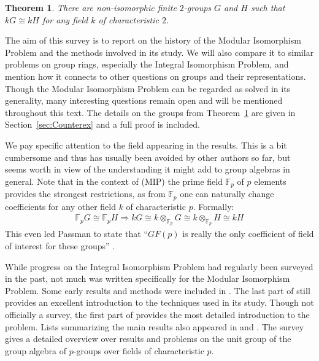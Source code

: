 \documentclass[11pt, a4paper]{amsart}
\newtheorem{theorem}{Theorem}[section]
\theoremstyle{definition}
\begin{document}
\begin{theorem}\label{th:counterex}\cite{GarciaLucasMargolisDelRioCounterexample} 
There are non-isomorphic finite $2$-groups $G$ and $H$ such that $kG \cong kH$ for any field $k$ of characteristic $2$.
\end{theorem}

The aim of this survey is to report on the history of the Modular Isomorphism Problem and the methods involved in its study. We will also compare it to similar problems on group rings, especially the Integral Isomorphism Problem, and mention how it connects to other questions on groups and their representations. Though the Modular Isomorphism Problem can be regarded as solved in its generality, many interesting questions remain open and will be mentioned throughout this text. The details on the groups from Theorem~\ref{th:counterex} are given in Section~\ref{sec:Counterex} and a full proof is included.

We pay specific attention to the field appearing in the results. This is a bit cumbersome and thus has usually been avoided by other authors so far, but seems worth in view of the understanding it might add to group algebras in general. Note that in the context of (MIP) the prime field $\mathbb{F}_p$ of $p$ elements provides the strongest restrictions, as from $\mathbb{F}_p$ one can naturally change coefficients for any other field $k$ of characteristic $p$. Formally: 
\begin{align}\label{eq:TensorFp}
\mathbb{F}_pG \cong \mathbb{F}_pH \Rightarrow kG \cong k \otimes_{\mathbb{F}_p}G \cong k \otimes_{\mathbb{F}_p}H \cong kH 
\end{align}
 This even led Passman to state that ``$GF(p)$ is really the only coefficient of field of interest for these groups'' \cite[p. 669]{PassmanAlgebraicStructure}. 

While progress on the Integral Isomorphism Problem had regularly been surveyed in the past, not much was written specifically for the Modular Isomorphism Problem. Some early results and methods were included in \cite{PassmanAlgebraicStructure, Sehgal78}. The last part of \cite{SandlingSurvey} still provides an excellent introduction to the techniques used in its study. Though not officially a survey, the first part of \cite{HertweckSoriano06} provides the most detailed introduction to the problem. Lists summarizing the main results also appeared in \cite{BleherKimmerleRoggenkampWursthorn99} and \cite{EickKonovalov11}. The survey \cite{BovdiUnitsSurvey} gives a detailed overview over results and problems on the unit group of the group algebra of $p$-groups over fields of characteristic $p$.
\end{document}
